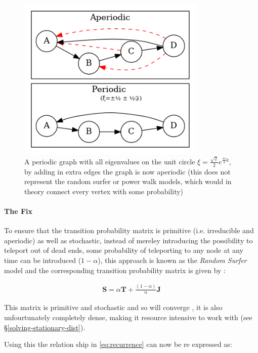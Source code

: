 \documentclass[11pt]{article}
\begin{document}
\begin{figure}[htbp]
\centering
\includegraphics[width=9cm]{media/dot/aperiodic.dot.png}
\caption{\label{fig:aperiodic}A periodic graph with all eigenvalues on the unit circle \(\xi = \frac{\sqrt{2}}{2} e^{\frac{\pi i}{4} k}\), by adding in extra edges the graph is now aperiodic (this does not represent the random surfer or power walk models, which would in theory connect every vertex with some probability)}
\end{figure}

\paragraph{The Fix}
\label{fix}
To ensure that the transition probability matrix is primitive (i.e. irreducible and aperiodic) as well as stochastic, instead of mereley introducing the possibility to teleport out of dead ends, some probability of teleporting to any node at any time can be introduced (\(1- \alpha\)), this approach is known as the \emph{Random Surfer} model and the corresponding transition probability matrix is given by \cite{larrypageAnatomyLargescaleHypertextual1998} :

\begin{align}
\mathbf{S} = \alpha \mathbf{T} + \frac{(1- \alpha)}{n} \mathbf{J} \label{eq:random-surfer}
\end{align}

This matrix is primitive and stochastic and so will converge
\cite[]{langvilleGooglePageRankScience2012}, it is also
unfourtunately completely dense, making it resource intensive to work with (see
\S \ref{solving-stationary-dist}).

Using this the relation ship in \eqref{eq:recurrence} can now be re
expressed as:
\end{document}
